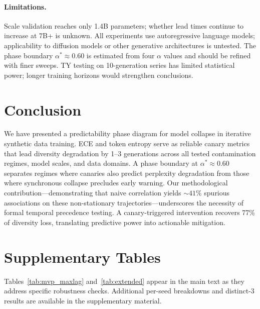 \documentclass[letterpaper,11pt]{article}
\begin{document}
\paragraph{Limitations.}
Scale validation reaches only 1.4B parameters; whether lead times continue to increase at 7B+ is unknown.
All experiments use autoregressive language models; applicability to diffusion models or other generative architectures is untested.
The phase boundary $\alpha^* \approx 0.60$ is estimated from four $\alpha$ values and should be refined with finer sweeps.
TY testing on 10-generation series has limited statistical power; longer training horizons would strengthen conclusions.

\section{Conclusion}

We have presented a predictability phase diagram for model collapse in iterative synthetic data training. ECE and token entropy serve as reliable canary metrics that lead diversity degradation by 1--3 generations across all tested contamination regimes, model scales, and data domains. A phase boundary at $\alpha^* \approx 0.60$ separates regimes where canaries also predict perplexity degradation from those where synchronous collapse precludes early warning. Our methodological contribution---demonstrating that naive correlation yields ${\sim}41\%$ spurious associations on these non-stationary trajectories---underscores the necessity of formal temporal precedence testing. A canary-triggered intervention recovers 77\% of diversity loss, translating predictive power into actionable mitigation.



\appendix

\section{Supplementary Tables}

Tables~\ref{tab:mvp_maxlag} and~\ref{tab:extended} appear in the main text as they address specific robustness checks. Additional per-seed breakdowns and distinct-3 results are available in the supplementary material.
\end{document}
